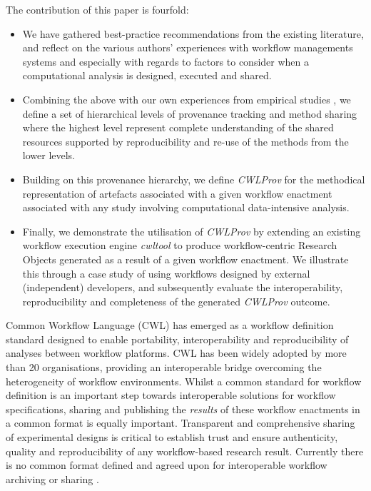 \documentclass[a4paper,num-refs]{oup-contemporary}
\begin{document}
\begin{keypoints*} \label{contributions}
The contribution of this paper is fourfold:
\begin{itemize}
\item We have gathered best-practice recommendations from the existing literature, and reflect on the various authors' experiences with workflow managements systems and especially with regards to factors to consider when a computational analysis is designed, executed and shared.
\item Combining the above with our own experiences from empirical studies \citep{kanwal_2017, wolstencroft_2013, moller_2017, Alterovitz2019}, we define a set of hierarchical levels of provenance tracking and method sharing where the highest level represent complete understanding of the shared resources supported by reproducibility and re-use of the methods from the lower levels.
\item Building on this provenance hierarchy, we define \textit{CWLProv} for the methodical representation of artefacts associated with a given workflow enactment associated with any study involving computational data-intensive analysis.
\item Finally, we demonstrate the utilisation of \textit{CWLProv} by extending an existing workflow execution engine \textit{cwltool} \citep{cwltool} to produce workflow-centric Research Objects generated as a result of a given workflow enactment. We illustrate this through a case study of using workflows designed by external (independent) developers, and subsequently evaluate the interoperability, reproducibility and completeness of the generated \textit{CWLProv}  outcome.
\end{itemize}
\end{keypoints*}

Common Workflow Language (CWL) \citep{cwl} has emerged as a workflow definition standard designed to enable portability, interoperability and reproducibility of analyses between workflow platforms. CWL has been widely adopted by more than 20 organisations, providing an interoperable bridge overcoming the heterogeneity of workflow environments. 
Whilst a common standard for workflow definition is an important step towards interoperable solutions for workflow specifications, sharing and publishing the \emph{results} of these workflow enactments in a common format is equally important. Transparent and comprehensive sharing of experimental designs is critical to establish trust and ensure authenticity, quality and reproducibility of any workflow-based research result. Currently there is no common format defined and agreed upon for interoperable workflow archiving or sharing \citep{Ivie2018}. 
\end{document}
